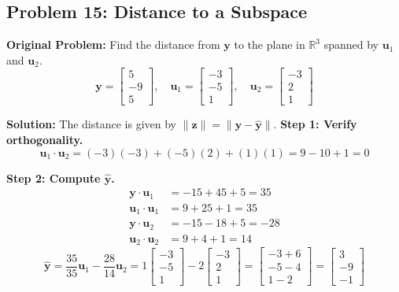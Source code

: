 \documentclass[11pt, letterpaper]{article}
\theoremstyle{definition}
\theoremstyle{remark}
\newcommand{\R}{\mathbb{R}}
\begin{document}
\subsection{Problem 15: Distance to a Subspace}
\textbf{Original Problem:} Find the distance from $\mathbf{y}$ to the plane in $\R^3$ spanned by $\mathbf{u}_1$ and $\mathbf{u}_2$.
\[ \mathbf{y} = \begin{bmatrix} 5 \\ -9 \\ 5 \end{bmatrix}, \quad \mathbf{u}_1 = \begin{bmatrix} -3 \\ -5 \\ 1 \end{bmatrix}, \quad \mathbf{u}_2 = \begin{bmatrix} -3 \\ 2 \\ 1 \end{bmatrix} \]

\textbf{Solution:}
The distance is given by $\|\mathbf{z}\| = \|\mathbf{y} - \hat{\mathbf{y}}\|$.
\textbf{Step 1: Verify orthogonality.}
\[ \mathbf{u}_1 \cdot \mathbf{u}_2 = (-3)(-3) + (-5)(2) + (1)(1) = 9 - 10 + 1 = 0 \]

\textbf{Step 2: Compute $\hat{\mathbf{y}}$.}
\begin{align*}
    \mathbf{y} \cdot \mathbf{u}_1 &= -15 + 45 + 5 = 35 \\
    \mathbf{u}_1 \cdot \mathbf{u}_1 &= 9 + 25 + 1 = 35 \\
    \mathbf{y} \cdot \mathbf{u}_2 &= -15 - 18 + 5 = -28 \\
    \mathbf{u}_2 \cdot \mathbf{u}_2 &= 9 + 4 + 1 = 14
\end{align*}
\[ \hat{\mathbf{y}} = \frac{35}{35}\mathbf{u}_1 - \frac{28}{14}\mathbf{u}_2 = 1\begin{bmatrix} -3 \\ -5 \\ 1 \end{bmatrix} - 2\begin{bmatrix} -3 \\ 2 \\ 1 \end{bmatrix} = \begin{bmatrix} -3 + 6 \\ -5 - 4 \\ 1 - 2 \end{bmatrix} = \begin{bmatrix} 3 \\ -9 \\ -1 \end{bmatrix} \]
\end{document}
